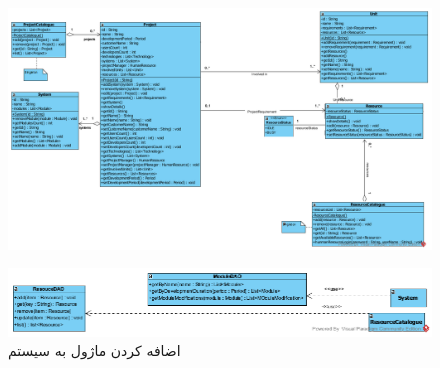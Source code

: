 \begin{landscape}
\begin{figure}[H]
	\centering
	\includegraphics[scale=0.65]{img/sequence-design/AddModuleToSystemC}	
\end{figure}
\begin{figure}[H]
	\centering
	\includegraphics[scale=0.65]{img/sequence-design/AddModuleToSystemD}	
	\caption{اضافه کردن ماژول به سیستم}
\end{figure}
\end{landscape}


